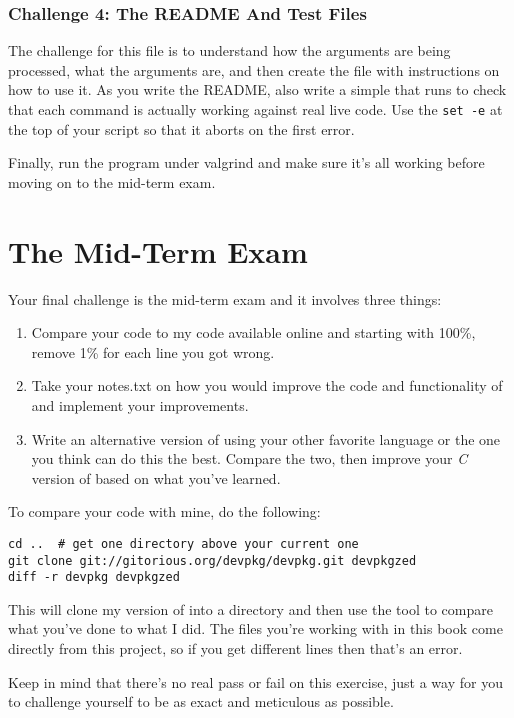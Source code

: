 \subsubsection{Challenge 4: The README And Test Files}

The challenge for this file is to understand how the arguments are
being processed, what the arguments are, and then create the 
file with instructions on how to use it.  As you write the README, also
write a simple  that runs  to check that
each command is actually working against real live code.  Use the \verb|set -e|
at the top of your script so that it aborts on the first error.

Finally, run the program under valgrind and make sure it's all working
before moving on to the mid-term exam.

\section{The Mid-Term Exam}

Your final challenge is the mid-term exam and it involves three things:

\begin{enumerate}
\item Compare your code to my code available online and starting with 100\%, 
    remove 1\% for each line you got wrong.
\item Take your notes.txt on how you would improve the code and functionality
    of  and implement your improvements.
\item Write an alternative version of  using your other 
    favorite language or the one you think can do this the best.  Compare
    the two, then improve your \emph{C} version of  based on what
    you've learned.
\end{enumerate}

To compare your code with mine, do the following:

\begin{lstlisting}
cd ..  # get one directory above your current one
git clone git://gitorious.org/devpkg/devpkg.git devpkgzed
diff -r devpkg devpkgzed
\end{lstlisting}

This will clone my version of  into a directory
 and then use the tool  to compare
what you've done to what I did.  The files you're working with in
this book come directly from this project, so if you get different
lines then that's an error.

Keep in mind that there's no real pass or fail on this exercise, just
a way for you to challenge yourself to be as exact and meticulous as
possible.

